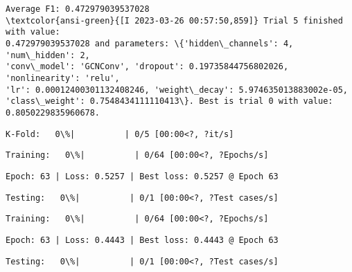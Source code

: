 \documentclass[11pt]{article}
\begin{document}
    
    \begin{Verbatim}[commandchars=\\\{\}]
Average F1: 0.472979039537028
\textcolor{ansi-green}{[I 2023-03-26 00:57:50,859]} Trial 5 finished with value:
0.472979039537028 and parameters: \{'hidden\_channels': 4, 'num\_hidden': 2,
'conv\_model': 'GCNConv', 'dropout': 0.19735844756802026, 'nonlinearity': 'relu',
'lr': 0.00012400301132408246, 'weight\_decay': 5.974635013883002e-05,
'class\_weight': 0.7548434111110413\}. Best is trial 0 with value:
0.8050229835960678.
    \end{Verbatim}

    
    \begin{Verbatim}[commandchars=\\\{\}]
K-Fold:   0\%|          | 0/5 [00:00<?, ?it/s]
    \end{Verbatim}

    
    
    \begin{Verbatim}[commandchars=\\\{\}]
Training:   0\%|          | 0/64 [00:00<?, ?Epochs/s]
    \end{Verbatim}

    
    \begin{Verbatim}[commandchars=\\\{\}]
Epoch: 63 | Loss: 0.5257 | Best loss: 0.5257 @ Epoch 63
    \end{Verbatim}

    
    \begin{Verbatim}[commandchars=\\\{\}]
Testing:   0\%|          | 0/1 [00:00<?, ?Test cases/s]
    \end{Verbatim}

    
    
    \begin{Verbatim}[commandchars=\\\{\}]
Training:   0\%|          | 0/64 [00:00<?, ?Epochs/s]
    \end{Verbatim}

    
    \begin{Verbatim}[commandchars=\\\{\}]
Epoch: 63 | Loss: 0.4443 | Best loss: 0.4443 @ Epoch 63
    \end{Verbatim}

    
    \begin{Verbatim}[commandchars=\\\{\}]
Testing:   0\%|          | 0/1 [00:00<?, ?Test cases/s]
    \end{Verbatim}
\end{document}
